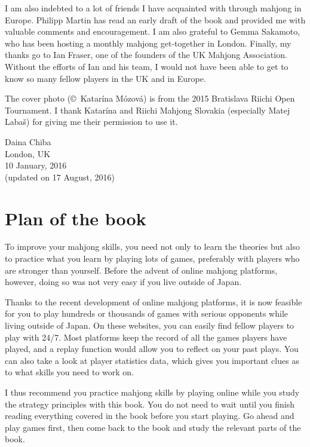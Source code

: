 \bigskip
I am also indebted to a lot of friends I have acquainted with through mahjong in Europe. Philipp Martin has read an early draft of the book and provided me with valuable comments and encouragement. I am also grateful to Gemma Sakamoto, who has been hosting a monthly mahjong get-together in London. 
Finally, my thanks go to Ian Fraser, one of the founders of the UK Mahjong Association. 
Without the efforts of Ian and his team, I would not have been able to get to know so many fellow players in the UK and in Europe.

\bigskip
The cover photo (\copyright~Katar\'{i}na M\'{o}zov\'{a}) is from the 2015 Bratislava Riichi Open Tournament. I thank Katar\'{i}na and Riichi Mahjong Slovakia (especially Matej Laba\v{s}) for giving me their permission to use it.


\vfill

\hfill Daina Chiba\\
\hfill London, UK\\
\hfill 10 January, 2016\\
\hfill (updated on 17 August, 2016)

\section*{Plan of the book}

To improve your mahjong skills, you need not only to learn the theories but also to practice what you learn by playing lots of games, preferably with players who are stronger than yourself. Before the advent of online mahjong platforms, however, doing so was not very easy if you live outside of Japan. 

\bigskip
Thanks to the recent development of online mahjong platforms, it is now feasible for you to play hundreds or thousands of games with serious opponents while living outside of Japan. On these websites, you can easily find fellow players to play with 24/7. Most platforms keep the record of all the games players have played, and a replay function would allow you to reflect on your past plays. You can also take a look at player statistics data, which gives you important clues as to what skills you need to work on.  

\bigskip
I thus recommend you practice mahjong skills by playing online while you study the strategy principles with this book. You do not need to wait until you finish reading everything covered in the book before you start playing. Go ahead and play games first, then come back to the book and study the relevant parts of the book. 

